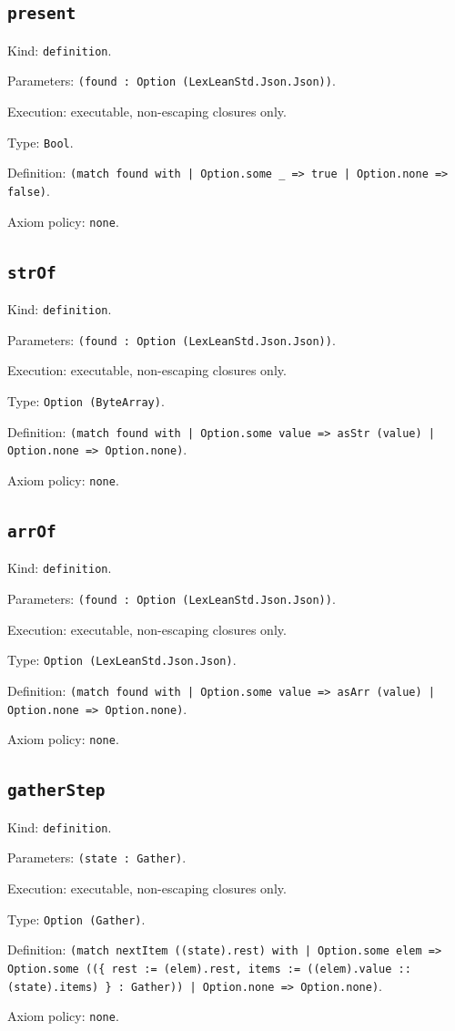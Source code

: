 \documentclass[11pt]{article}
\begin{document}
\subsection*{\texttt{present}}
\noindent Kind: \texttt{definition}.\par
\noindent Parameters: \texttt{(found : Option (LexLeanStd.Json.Json))}.\par
\noindent Execution: executable, non-escaping closures only.\par
\noindent Type: \texttt{Bool}.\par
\noindent Definition: \texttt{(match found with | Option.some \_ => true | Option.none => false)}.\par
\noindent Axiom policy: \texttt{none}.\par
\subsection*{\texttt{strOf}}
\noindent Kind: \texttt{definition}.\par
\noindent Parameters: \texttt{(found : Option (LexLeanStd.Json.Json))}.\par
\noindent Execution: executable, non-escaping closures only.\par
\noindent Type: \texttt{Option (ByteArray)}.\par
\noindent Definition: \texttt{(match found with | Option.some value => asStr (value) | Option.none => Option.none)}.\par
\noindent Axiom policy: \texttt{none}.\par
\subsection*{\texttt{arrOf}}
\noindent Kind: \texttt{definition}.\par
\noindent Parameters: \texttt{(found : Option (LexLeanStd.Json.Json))}.\par
\noindent Execution: executable, non-escaping closures only.\par
\noindent Type: \texttt{Option (LexLeanStd.Json.Json)}.\par
\noindent Definition: \texttt{(match found with | Option.some value => asArr (value) | Option.none => Option.none)}.\par
\noindent Axiom policy: \texttt{none}.\par
\subsection*{\texttt{gatherStep}}
\noindent Kind: \texttt{definition}.\par
\noindent Parameters: \texttt{(state : Gather)}.\par
\noindent Execution: executable, non-escaping closures only.\par
\noindent Type: \texttt{Option (Gather)}.\par
\noindent Definition: \texttt{(match nextItem ((state).rest) with | Option.some elem => Option.some ((\{ rest := (elem).rest, items := ((elem).value :: (state).items) \} : Gather)) | Option.none => Option.none)}.\par
\noindent Axiom policy: \texttt{none}.\par
\end{document}
